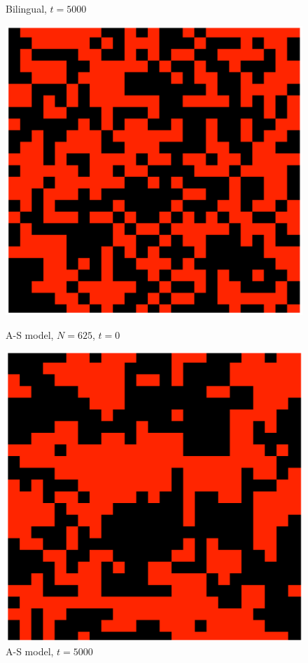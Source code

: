 \begin{figure}[h]
\begin{minipage}[t]{0.43\linewidth}
    \caption{\scriptsize Bilingual, \(t=5000\)}
    \label{reg_net_bi2}
\end{minipage}
\vspace{-5pt}
\begin{minipage}[t]{0.43\linewidth}
    \centering
    \includegraphics[width=\textwidth]{images/task1/regular_net_Str_t=1.png} 
    \caption{\scriptsize A-S model, \(N=625\), \(t=0\)}
    \label{reg_net_Str1}
\end{minipage}
\hfill
\begin{minipage}[t]{0.43\linewidth}
    \centering
    \includegraphics[width=\textwidth]{images/task1/regular_net_Str_t=5000.png} 
    \caption{\scriptsize A-S model, \(t=5000\)}
    \label{reg_net_Str2}
\end{minipage}
\end{figure}
